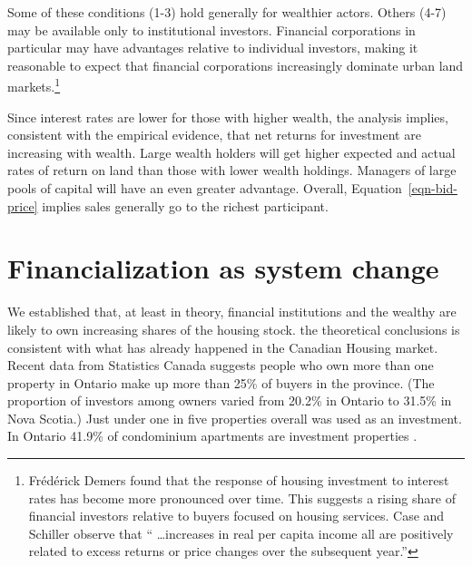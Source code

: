 Some  of these conditions (1-3) hold generally for wealthier actors. Others (4-7) may be available only to institutional investors.  Financial corporations in particular may have advantages relative to individual investors, making it reasonable to expect that financial corporations increasingly dominate urban land 
markets.\footnote{Fr\'ed\'erick Demers \cite{demersModellingForecastingHousing2005} found that the response of housing investment to interest rates has become more pronounced over time. This suggests a rising share of financial investors relative to buyers focused on housing services. Case and Schiller \cite{caseThereBubbleHousing2003} observe that `` \dots increases in real per capita income all are positively related to excess returns or price changes over the subsequent year.''}  

Since interest rates are lower for those with higher wealth, the analysis implies, consistent with the empirical evidence, that net returns for investment are increasing with wealth. Large wealth holders will get higher expected and actual rates of return on land than those with lower wealth holdings. Managers of large pools of capital will have an even greater   advantage. Overall, Equation~\ref{eqn-bid-price} implies  sales generally go to the richest participant.
 




\section{Financialization as system change} \label{section-system}
We established that, at least in theory,  financial institutions and the wealthy are likely to own increasing shares of the housing stock. the theoretical conclusions is consistent with what has already happened in the Canadian Housing market. Recent data from Statistics Canada \cite{fontaineResidentialRealEstate2023} suggests people who own more than one property in Ontario make up more than 25\% of buyers in the province. (The proportion of investors among owners varied from 20.2\% in Ontario to 31.5\% in Nova Scotia.)
Just under one in five properties overall was used as an investment.
In Ontario 41.9\% of condominium apartments are investment properties \cite{statisticscanadaBuyRentHousing2022}.

